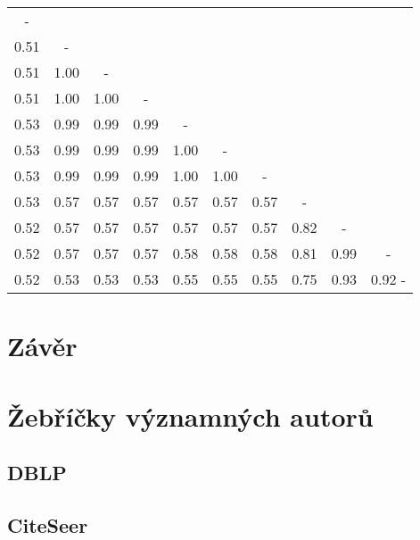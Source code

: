 \documentclass[12pt,titlepage]{report}
\begin{document}
\begin{tabular}{|c|c|c|c|c|c|c|c|c|c|}
 - \\
0.51 & - \\
0.51 & 1.00 & - \\
0.51 & 1.00 & 1.00 & - \\
0.53 & 0.99 & 0.99 & 0.99 & - \\
0.53 & 0.99 & 0.99 & 0.99 & 1.00 & - \\
0.53 & 0.99 & 0.99 & 0.99 & 1.00 & 1.00 & - \\
0.53 & 0.57 & 0.57 & 0.57 & 0.57 & 0.57 & 0.57 & - \\
0.52 & 0.57 & 0.57 & 0.57 & 0.57 & 0.57 & 0.57 & 0.82 & - \\
0.52 & 0.57 & 0.57 & 0.57 & 0.58 & 0.58 & 0.58 & 0.81 & 0.99 & - \\
0.52 & 0.53 & 0.53 & 0.53 & 0.55 & 0.55 & 0.55 & 0.75 & 0.93 & 0.92 - \\
\end{tabular}

\chapter{Závěr}




\newpage
\appendix
\chapter{Žebříčky významných autorů}
\label{chapter:zebricky}

\newpage
\section{DBLP}
\begin{footnotesize}











\end{footnotesize}

\section{CiteSeer}
\begin{footnotesize}
\end{footnotesize}
\end{document}
